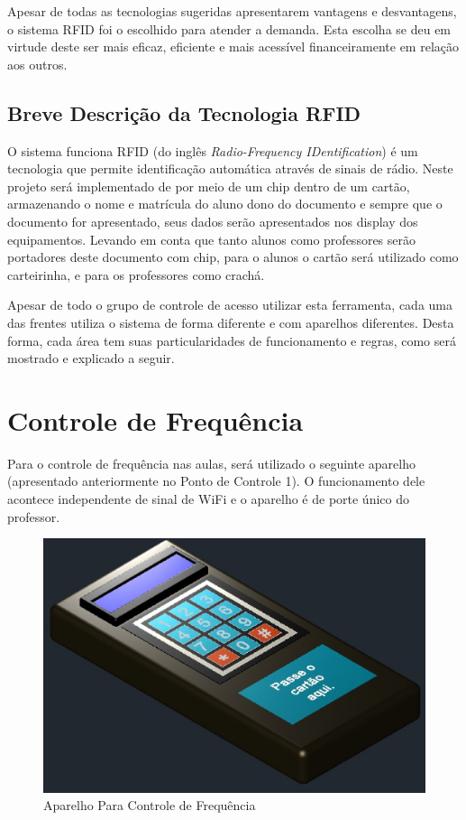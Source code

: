 Apesar de todas as tecnologias sugeridas apresentarem vantagens e desvantagens, o sistema RFID foi o escolhido para atender
a demanda. Esta escolha se deu em virtude deste ser mais eficaz, eficiente e mais acessível financeiramente em relação aos
outros.

\subsection{Breve Descrição da Tecnologia RFID}
O sistema funciona RFID (do inglês \textit{Radio-Frequency IDentification}) é um tecnologia que permite identificação automática
 através de sinais de rádio. Neste projeto será implementado de  por meio de um chip dentro de um cartão, armazenando o
 nome e matrícula do aluno dono do documento e sempre que o documento for apresentado, seus dados serão apresentados nos
 display dos equipamentos. Levando em conta que tanto alunos como professores serão portadores deste documento com chip,
 para o alunos o cartão será utilizado como carteirinha, e para os professores como crachá.

Apesar de todo o grupo de controle de acesso utilizar esta ferramenta, cada uma das frentes utiliza o sistema de forma
diferente e com aparelhos diferentes. Desta forma, cada área tem suas particularidades de funcionamento e regras, como será
 mostrado e explicado a seguir.

\section{Controle de Frequência}
Para o controle de frequência nas aulas, será utilizado o seguinte aparelho (apresentado anteriormente no Ponto de Controle 1).
O funcionamento dele acontece independente de sinal de WiFi e o aparelho é de porte único do professor.

\begin{figure}[!h]
  \centering
  \includegraphics[keepaspectratio=true,scale=0.45]{figuras/freq.eps}
  \caption{Aparelho Para Controle de Frequência}
\end{figure}

